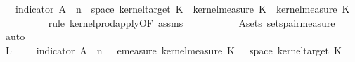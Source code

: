 \begin{isabellebody}
\ {\isacharparenleft}{\kern0pt}{\isasymintegral}\isactrlsup {\isacharplus}{\kern0pt}{\isasymomega}\ {\isacharparenleft}{\kern0pt}{\isasymintegral}\isactrlsup {\isacharplus}{\kern0pt}{\isasymomega}\ indicator\ {\isacharparenleft}{\kern0pt}A\ {\isasymomega}\ n\ {\isasymtimes}\ space\ {\isacharparenleft}{\kern0pt}kernel{\isacharunderscore}{\kern0pt}target\ K{\isacharunderscore}{\kern0pt}{}{\isacharparenright}{\kern0pt}{\isacharparenright}{\kern0pt}\ {\isacharparenleft}{\kern0pt}{\isasymomega}\ {\isasymomega}kernel{\isacharunderscore}{\kern0pt}measure\ K{\isacharunderscore}{\kern0pt}{}\ {\isacharparenleft}{\kern0pt}{\isasymomega}\ {\isasymomega}kernel{\isacharunderscore}{\kern0pt}measure\ K{\isacharunderscore}{\kern0pt}{}\ {\isasymomega}\isanewline
\ \ \ \ \ \ \ \ \isamarkupfalse%
\ {\isacharparenleft}{\kern0pt}rule\ kernel{\isacharunderscore}{\kern0pt}prod{\isacharunderscore}{\kern0pt}apply{\isacharbrackleft}{\kern0pt}OF\ assms\ {\isasymomega}{\isacharbrackright}{\kern0pt}{\isacharparenright}{\kern0pt}\isanewline
\ \ \ \ \ \ \ \ \isamarkupfalse%
\ A{\isacharunderscore}{\kern0pt}sets\ sets{\isacharunderscore}{\kern0pt}pair{\isacharunderscore}{\kern0pt}measure\ \isamarkupfalse%
\ auto\isanewline
\ \ \ \ \ \ \isamarkupfalse%
\ \isamarkupfalse%
\ L{\isacharcolon}{\kern0pt}\ {\isachardoublequoteopen}{\isachardot}{\kern0pt}{\isachardot}{\kern0pt}{\isachardot}{\kern0pt}\ {\isacharequal}{\kern0pt}\ {\isasymintegral}\isactrlsup {\isacharplus}{\kern0pt}\ {\isasymomega}\ indicator\ {\isacharparenleft}{\kern0pt}A\ {\isasymomega}\ n{\isacharparenright}{\kern0pt}\ {\isasymomega}\ {\isacharasterisk}{\kern0pt}\ emeasure\ {\isacharparenleft}{\kern0pt}kernel{\isacharunderscore}{\kern0pt}measure\ K{\isacharunderscore}{\kern0pt}{}\ {\isacharparenleft}{\kern0pt}{\isasymomega}\ {\isasymomega}\ {\isacharparenleft}{\kern0pt}space\ {\isacharparenleft}{\kern0pt}kernel{\isacharunderscore}{\kern0pt}target\ K{\isacharunderscore}{\kern0pt}{}{\isacharparenright}{\kern0pt}{\isacharparenright}{\kern0pt}\isanewline

\end{isabellebody}
